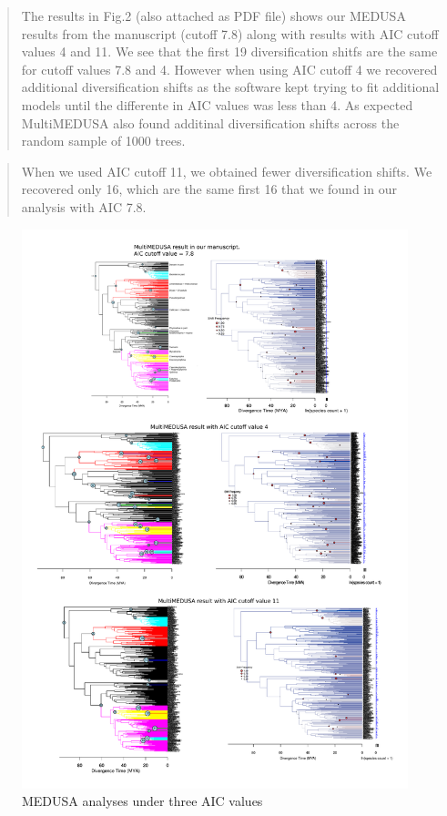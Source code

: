 \documentclass[]{article}
\begin{document}
\begin{quote}
\color{blue}
The results in Fig.2 (also attached as PDF file) shows our MEDUSA
results from the manuscript (cutoff 7.8) along with results with AIC
cutoff values 4 and 11. We see that the first 19 diversification shitfs
are the same for cutoff values 7.8 and 4. However when using AIC cutoff
4 we recovered additional diversification shifts as the software kept
trying to fit additional models until the differente in AIC values was
less than 4. As expected MultiMEDUSA also found additinal
diversification shifts across the random sample of 1000 trees.
\end{quote}

\begin{quote}
\color{blue}
When we used AIC cutoff 11, we obtained fewer diversification shifts. We
recovered only 16, which are the same first 16 that we found in our
analysis with AIC 7.8.
\end{quote}

\begin{figure}[htbp]
\centering
\includegraphics{multimedusa_7_8_vs_4_vs_11_AIC_cutoff.pdf}
\caption{MEDUSA analyses under three AIC values}
\end{figure}
\end{document}
